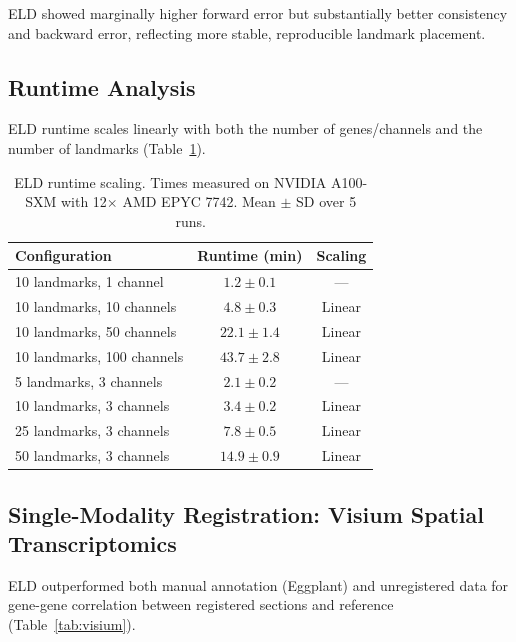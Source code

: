 \documentclass[11pt]{article}
\begin{document}
ELD showed marginally higher forward error but substantially better consistency and backward error, reflecting more stable, reproducible landmark placement.

\subsection{Runtime Analysis}

ELD runtime scales linearly with both the number of genes/channels and the number of landmarks (Table~\ref{tab:runtime}).

\begin{table}[H]
\centering
\caption{ELD runtime scaling. Times measured on NVIDIA A100-SXM with 12$\times$ AMD EPYC 7742. Mean $\pm$ SD over 5 runs.}
\label{tab:runtime}
\begin{tabular}{lcc}
\toprule
\textbf{Configuration} & \textbf{Runtime (min)} & \textbf{Scaling} \\
\midrule
10 landmarks, 1 channel & $1.2 \pm 0.1$ & --- \\
10 landmarks, 10 channels & $4.8 \pm 0.3$ & Linear \\
10 landmarks, 50 channels & $22.1 \pm 1.4$ & Linear \\
10 landmarks, 100 channels & $43.7 \pm 2.8$ & Linear \\
\midrule
5 landmarks, 3 channels & $2.1 \pm 0.2$ & --- \\
10 landmarks, 3 channels & $3.4 \pm 0.2$ & Linear \\
25 landmarks, 3 channels & $7.8 \pm 0.5$ & Linear \\
50 landmarks, 3 channels & $14.9 \pm 0.9$ & Linear \\
\bottomrule
\end{tabular}
\end{table}

\subsection{Single-Modality Registration: Visium Spatial Transcriptomics}

ELD outperformed both manual annotation (Eggplant) and unregistered data for gene-gene correlation between registered sections and reference (Table~\ref{tab:visium}).
\end{document}

